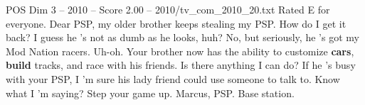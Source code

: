 \begin{textsample}{POS Dim 3 – 2010 – Score 2.00 – 2010/tv\_com\_2010\_20.txt}  \label{ex:f3_pos_042}
Rated E for everyone.
Dear PSP, my older brother keeps stealing my PSP.
How do I get it back?
I guess he 's not as dumb as he looks, huh?
No, but seriously, he 's got my Mod Nation racers.
Uh-oh.
Your brother now has the ability to customize \textbf{cars}, \textbf{build} tracks, and race with his friends.
Is there anything I can do?
If he 's busy with your PSP, I 'm sure his lady friend could use someone to talk to.
Know what I 'm saying?
Step your game up.
Marcus, PSP.
Base station.

\end{textsample}
